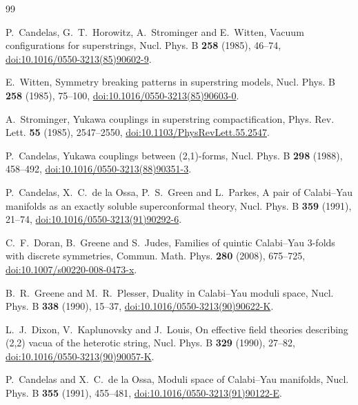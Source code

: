 \documentclass[11pt]{amsart}
\theoremstyle{definition}
\theoremstyle{remark}
\begin{document}
\makeatletter{}\makeatother
\begin{thebibliography}{99}\raggedright\advance\leftskip{}

P.~Candelas, G.~T.~Horowitz, A.~Strominger and E.~Witten, Vacuum
configurations for superstrings, Nucl. Phys. B \textbf{258} (1985), 46--74,
\href{https://doi.org/10.1016/0550-3213(85)90602-9}{doi:10.1016/0550-3213(85)90602-9}.

E.~Witten, Symmetry breaking patterns in superstring models, Nucl. Phys. B
\textbf{258} (1985), 75--100,
\href{https://doi.org/10.1016/0550-3213(85)90603-0}{doi:10.1016/0550-3213(85)90603-0}.

A.~Strominger, Yukawa couplings in superstring compactification, Phys. Rev.
Lett. \textbf{55} (1985), 2547--2550,
\href{https://doi.org/10.1103/PhysRevLett.55.2547}{doi:10.1103/PhysRevLett.55.2547}.

P.~Candelas, Yukawa couplings between (2,1)-forms, Nucl. Phys. B
\textbf{298} (1988), 458--492,
\href{https://doi.org/10.1016/0550-3213(88)90351-3}{doi:10.1016/0550-3213(88)90351-3}.

P.~Candelas, X.~C.~de la Ossa, P.~S.~Green and L.~Parkes, A pair of
Calabi--Yau manifolds as an exactly soluble superconformal theory, Nucl.
Phys. B \textbf{359} (1991), 21--74,
\href{https://doi.org/10.1016/0550-3213(91)90292-6}{doi:10.1016/0550-3213(91)90292-6}.

C.~F.~Doran, B.~Greene and S.~Judes, Families of quintic Calabi--Yau 3-folds
with discrete symmetries, Commun. Math. Phys. \textbf{280} (2008), 675--725,
\href{https://doi.org/10.1007/s00220-008-0473-x}{doi:10.1007/s00220-008-0473-x}.

B.~R.~Greene and M.~R.~Plesser, Duality in Calabi--Yau moduli space, Nucl.
Phys. B \textbf{338} (1990), 15--37,
\href{https://doi.org/10.1016/0550-3213(90)90622-K}{doi:10.1016/0550-3213(90)90622-K}.

L.~J.~Dixon, V.~Kaplunovsky and J.~Louis, On effective field theories
describing (2,2) vacua of the heterotic string, Nucl. Phys. B \textbf{329}
(1990), 27--82,
\href{https://doi.org/10.1016/0550-3213(90)90057-K}{doi:10.1016/0550-3213(90)90057-K}.

P.~Candelas and X.~C.~de la Ossa, Moduli space of Calabi--Yau manifolds,
Nucl. Phys. B \textbf{355} (1991), 455--481,
\href{https://doi.org/10.1016/0550-3213(91)90122-E}{doi:10.1016/0550-3213(91)90122-E}.


\end{thebibliography}
\end{document}
